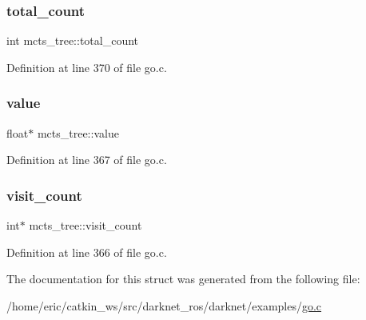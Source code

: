 \subsubsection{\texorpdfstring{total\_count}{total\_count}}
{\footnotesize\ttfamily int mcts\+\_\+tree\+::total\+\_\+count}



Definition at line 370 of file go.\+c.

\mbox{\label{structmcts__tree_a4d2670aa15eb6c5e8fd5334e34bd3539}} 
\subsubsection{\texorpdfstring{value}{value}}
{\footnotesize\ttfamily float$\ast$ mcts\+\_\+tree\+::value}



Definition at line 367 of file go.\+c.

\mbox{\label{structmcts__tree_a9741f27a8cbb14c3c80fa893d07102ef}} 
\subsubsection{\texorpdfstring{visit\_count}{visit\_count}}
{\footnotesize\ttfamily int$\ast$ mcts\+\_\+tree\+::visit\+\_\+count}



Definition at line 366 of file go.\+c.



The documentation for this struct was generated from the following file\+:\begin{DoxyCompactItemize}
\item 
/home/eric/catkin\+\_\+ws/src/darknet\+\_\+ros/darknet/examples/\mbox{\hyperlink{go_8c}{go.\+c}}\end{DoxyCompactItemize}
